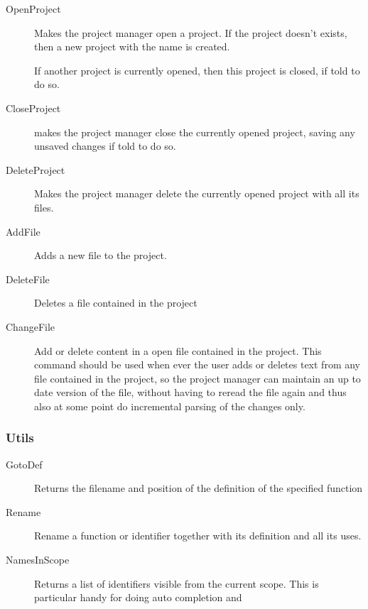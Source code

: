 \begin{description}
\item[OpenProject] Makes the project manager open a project. If the
  project doesn't exists, then a new project with the name is created.

  If another project is currently opened, then this project is closed, if told
  to do so.
\item[CloseProject] makes the project manager close the currently opened project,
  saving any unsaved changes if told to do so. 
\item[DeleteProject] Makes the project manager delete the currently opened project
  with all its files.
\item[AddFile] Adds a new file to the project.
\item[DeleteFile] Deletes a file contained in the project
\item[ChangeFile] Add or delete content in a open file contained in the
  project. This command should be used when ever the user adds or deletes text
  from any file contained in the project, so the project manager can maintain an
  up to date version of the file, without having to reread the file again and
  thus also at some point do incremental parsing of the changes only.
\end{description}


\subsubsection*{Utils}

\begin{description}
\item[GotoDef] Returns the filename and position of the definition of the
  specified function
\item[Rename] Rename a function or identifier together with its definition and
  all its uses.
\item[NamesInScope] Returns a list of identifiers visible from the current
  scope. This is particular handy for doing auto completion and
\end{description}



